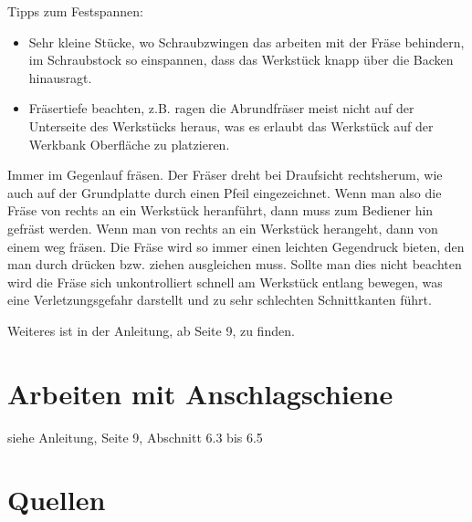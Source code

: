 \documentclass{\basedir/fablab-document}
\begin{document}
Tipps zum Festspannen:
\begin{itemize}
    \item Sehr kleine Stücke, wo Schraubzwingen das arbeiten mit der Fräse behindern, im Schraubstock so einspannen, dass das Werkstück knapp über die Backen hinausragt.
    \item Fräsertiefe beachten, z.B. ragen die Abrundfräser meist nicht auf der Unterseite des Werkstücks heraus, was es erlaubt das Werkstück auf der Werkbank Oberfläche zu platzieren.
\end{itemize}

Immer im Gegenlauf fräsen. Der Fräser dreht bei Draufsicht rechtsherum, wie auch auf der Grundplatte durch einen Pfeil eingezeichnet. Wenn man also die Fräse von rechts an ein Werkstück heranführt, dann muss zum Bediener hin gefräst werden. Wenn man von rechts an ein Werkstück herangeht, dann von einem weg fräsen. Die Fräse wird so immer einen leichten Gegendruck bieten, den man durch drücken bzw. ziehen ausgleichen muss. Sollte man dies nicht beachten wird die Fräse sich unkontrolliert schnell am Werkstück entlang bewegen, was eine Verletzungsgefahr darstellt und zu sehr schlechten Schnittkanten führt.

Weiteres ist in der Anleitung, ab Seite 9, zu finden.

\section{Arbeiten mit Anschlagschiene}
siehe Anleitung, Seite 9, Abschnitt 6.3 bis 6.5

\newpage
\section{Quellen}
\end{document}

